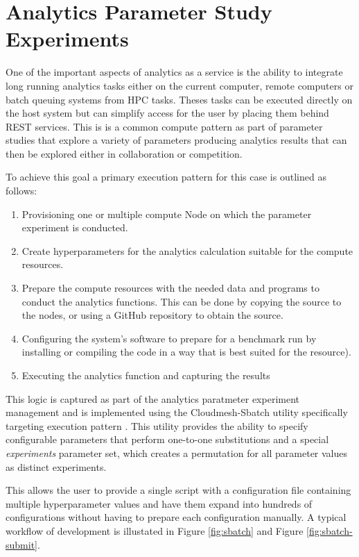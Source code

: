 \section{Analytics Parameter Study Experiments}

One of the important aspects of analytics as a service is the ability to integrate long running analytics tasks either 
on the current computer, remote computers or batch queuing systems from HPC tasks. Theses tasks can be 
executed directly on the host system but can simplify access for the user by placing them behind REST 
services. This is is a common compute pattern as part of parameter studies that explore a variety of 
parameters producing analytics results that can then be explored either in collaboration or competition. 

To achieve this goal a primary execution pattern for this case is outlined as follows:


\begin{enumerate}
    \item Provisioning one or multiple compute Node on which the parameter experiment is conducted.
    \item Create hyperparameters for the analytics calculation suitable for the compute resources.
    \item Prepare the compute resources with the needed data and programs to conduct the analytics 
          functions. This can be done by copying the source to the nodes, or using a GitHub repository to 
          obtain the source.
    \item Configuring the system's software to prepare for a benchmark run by installing or compiling the code 
          in a way that is best suited for the resource).
    \item Executing the analytics function and capturing the results
\end{enumerate}

This logic is captured as part of the analytics paratmeter experiment  management and is implemented using the Cloudmesh-Sbatch utility specifically targeting execution pattern \cite{repo-cloudmesh-sbatch}.
This utility provides the ability to specify configurable parameters that perform one-to-one substitutions and a special \textit{experiments} parameter set, which creates a permutation for all parameter values as distinct experiments.

This allows the user to provide a single script with a configuration file containing multiple hyperparameter values and have them expand into hundreds of configurations without having to prepare each configuration manually.
A typical workflow of development is illustated in Figure \ref{fig:sbatch} and Figure \ref{fig:sbatch-submit}.

